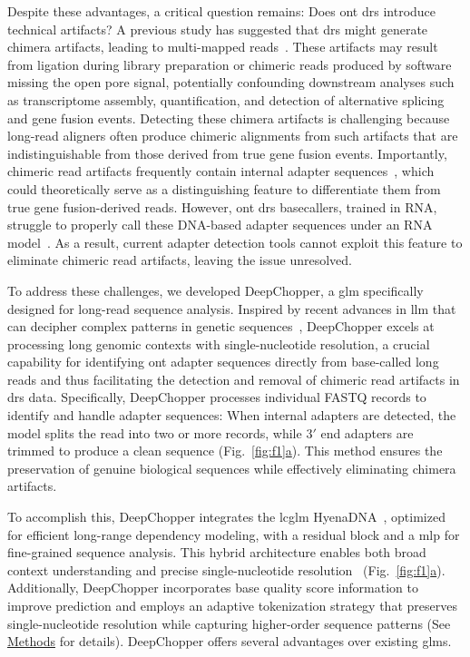 \documentclass[pdflatex,sn-nature, lineno]{sn-jnl}%
\newcommand{\figref}[2]{Fig.~\hyperref[#1]{\ref*{#1}#2}}
\begin{document}
Despite these advantages, a critical question remains: Does \gls{ont} \gls{drs} introduce technical artifacts?
A previous study has suggested that \gls{drs} might generate chimera artifacts, leading to multi-mapped reads~\cite{smith2020molecular}.
These artifacts may result from ligation during library preparation or chimeric reads produced by software missing the open pore signal, potentially confounding downstream analyses such as transcriptome assembly, quantification, and detection of alternative splicing and gene fusion events.
Detecting these chimera artifacts is challenging because long-read aligners often produce chimeric alignments from such artifacts that are indistinguishable from those derived from true gene fusion events.
Importantly, chimeric read artifacts frequently contain internal adapter sequences~\cite{smith2020molecular}, which could theoretically serve as a distinguishing feature to differentiate them from true gene fusion-derived reads.
However, \gls{ont} \gls{drs} basecallers, trained in RNA, struggle to properly call these DNA-based adapter sequences under an RNA model~\cite{liu2024sequencing}.
As a result, current adapter detection tools cannot exploit this feature to eliminate chimeric read artifacts, leaving the issue unresolved.

To address these challenges, we developed DeepChopper, a \gls{glm} specifically designed for long-read sequence analysis.
Inspired by recent advances in \gls{llm} that can decipher complex patterns in genetic sequences~\cite{benegas2024genomic}, DeepChopper excels at processing long genomic contexts with single-nucleotide resolution, a crucial capability for identifying \gls{ont} adapter sequences directly from base-called long reads and thus facilitating the detection and removal of chimeric read artifacts in \gls{drs} data.
Specifically, DeepChopper processes individual FASTQ records to identify and handle adapter sequences: When internal adapters are detected, the model splits the read into two or more records, while $3'$ end adapters are trimmed to produce a clean sequence (\figref{fig:f1}{a}).
This method ensures the preservation of genuine biological sequences while effectively eliminating chimera artifacts.

To accomplish this, DeepChopper integrates the \gls{lcglm} HyenaDNA~\cite{nguyen2024hyenadna}, optimized for efficient long-range dependency modeling, with a residual block and a \gls{mlp} for fine-grained sequence analysis.
This hybrid architecture enables both broad context understanding and precise single-nucleotide resolution~\cite{poli2023hyena, he2015deep} (\figref{fig:f1}{a}).
Additionally, DeepChopper incorporates base quality score information to improve prediction and employs an adaptive tokenization strategy that preserves single-nucleotide resolution while capturing higher-order sequence patterns (See \hyperref[sec:methods]{Methods} for details).
DeepChopper offers several advantages over existing \glspl{glm}.
\end{document}
